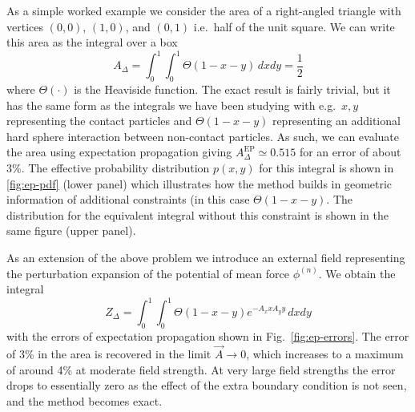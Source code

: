 \documentclass[11pt,twoside]{report}
\begin{document}
As a simple worked example we consider the area of a right-angled triangle with vertices $(0,0)$, $(1,0)$, and $(0,1)$ i.e.\ half of the unit square.
We can write this area as the integral over a box
\begin{equation}\label{eq:ep-area-integral}
  A_\Delta = \int_0^1 \int_0^1 \Theta(1 - x - y) \, dx dy
  = \frac{1}{2}
\end{equation}
where $\Theta(\cdot)$ is the Heaviside function.
The exact result is fairly trivial, but it has the same form as the integrals we have been studying with e.g.\ $x,y$ representing the contact particles and $\Theta(1 - x - y)$ representing an additional hard sphere interaction between non-contact particles.
As such, we can evaluate the area using expectation propagation giving $A_\Delta^\mathrm{EP} \simeq 0.515$ for an error of about 3\%.
The effective probability distribution $p(x,y)$ for this integral is shown in \ref{fig:ep-pdf} (lower panel) which illustrates how the method builds in geometric information of additional constraints (in this case $\Theta(1 - x - y)$.
The distribution for the equivalent integral without this constraint is shown in the same figure (upper panel).

As an extension of the above problem we introduce an external field representing the perturbation expansion of the potential of mean force $\phi^{(n)}$.
We obtain the integral
\begin{equation}\label{eq:ep-triangle-integral}
  Z_\Delta = \int_0^1 \int_0^1 \Theta(1 - x - y) e^{-A_x x  A_y y} \, dx dy
\end{equation}
with the errors of expectation propagation shown in Fig.\ \ref{fig:ep-errors}.
The error of 3\% in the area is recovered in the limit $\vec{A} \to 0$, which increases to a maximum of around 4\% at moderate field strength.
At very large field strengths the error drops to essentially zero as the effect of the extra boundary condition is not seen, and the method becomes exact.
\end{document}

